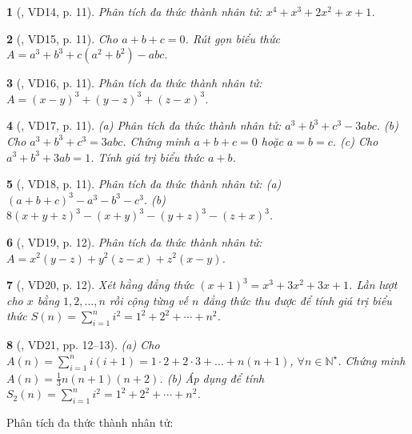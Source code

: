 \documentclass{article}
\newtheorem{baitoan}{}
\begin{document}
\begin{baitoan}[\cite{Binh_Toan_8_tap_1}, VD14, p. 11]
	Phân tích đa thức thành nhân tử: $x^4 + x^3 + 2x^2 + x + 1$.
\end{baitoan}

\begin{baitoan}[\cite{Binh_Toan_8_tap_1}, VD15, p. 11]
	Cho $a + b + c = 0$. Rút gọn biểu thức $A = a^3 + b^3 + c(a^2 + b^2) - abc$.
\end{baitoan}

\begin{baitoan}[\cite{Binh_Toan_8_tap_1}, VD16, p. 11]
	Phân tích đa thức thành nhân tử: $A = (x - y)^3 + (y - z)^3 + (z - x)^3$.
\end{baitoan}

\begin{baitoan}[\cite{Binh_Toan_8_tap_1}, VD17, p. 11]
	(a) Phân tích đa thức thành nhân tử: $a^3 + b^3 + c^3 - 3abc$. (b) Cho $a^3 + b^3 + c^3 = 3abc$. Chứng minh $a + b + c = 0$ hoặc $a = b = c$. (c) Cho $a^3 + b^3 + 3ab = 1$. Tính giá trị biểu thức $a + b$.
\end{baitoan}

\begin{baitoan}[\cite{Binh_Toan_8_tap_1}, VD18, p. 11]
	Phân tích đa thức thành nhân tử: (a) $(a + b + c)^3 - a^3 - b^3 - c^3$. (b) $8(x + y + z)^3 - (x + y)^3 - (y + z)^3 - (z + x)^3$.
\end{baitoan}

\begin{baitoan}[\cite{Binh_Toan_8_tap_1}, VD19, p. 12]
	Phân tích đa thức thành nhân tử: $A = x^2(y - z) + y^2(z - x) + z^2(x - y)$.
\end{baitoan}

\begin{baitoan}[\cite{Binh_Toan_8_tap_1}, VD20, p. 12]
	Xét hằng đẳng thức $(x + 1)^3 = x^3 + 3x^2 + 3x + 1$. Lần lượt cho $x$ bằng $1,2,\ldots,n$ rồi cộng từng vế $n$ đẳng thức thu được để tính giá trị biểu thức $S(n) = \sum_{i=1}^n i^2 = 1^2 + 2^2 + \cdots + n^2$.
\end{baitoan}

\begin{baitoan}[\cite{Binh_Toan_8_tap_1}, VD21, pp. 12--13]
	(a) Cho $A(n) = \sum_{i=1}^n i(i + 1) = 1\cdot2 + 2\cdot3 + \ldots + n(n + 1)$, $\forall n\in\mathbb{N}^\star$. Chứng minh $A(n) = \frac{1}{3}n(n + 1)(n + 2)$. (b) Áp dụng để tính $S_2(n) = \sum_{i=1}^n i^2 = 1^2 + 2^2 + \cdots + n^2$.
\end{baitoan}
Phân tích đa thức thành nhân tử:
\end{document}
